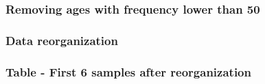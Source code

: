 \documentclass[
]{article}
\newenvironment{Shaded}{\begin{snugshade}}{\end{snugshade}}
\newcommand{\CommentTok}[1]{\textcolor[rgb]{0.56,0.35,0.01}{\textit{#1}}}
\newcommand{\DataTypeTok}[1]{\textcolor[rgb]{0.13,0.29,0.53}{#1}}
\newcommand{\DecValTok}[1]{\textcolor[rgb]{0.00,0.00,0.81}{#1}}
\newcommand{\KeywordTok}[1]{\textcolor[rgb]{0.13,0.29,0.53}{\textbf{#1}}}
\newcommand{\NormalTok}[1]{#1}
\newcommand{\OperatorTok}[1]{\textcolor[rgb]{0.81,0.36,0.00}{\textbf{#1}}}
\newcommand{\StringTok}[1]{\textcolor[rgb]{0.31,0.60,0.02}{#1}}
\begin{document}
\hypertarget{removing-ages-with-frequency-lower-than-50}{%
\subsubsection{Removing ages with frequency lower than
50}\label{removing-ages-with-frequency-lower-than-50}}

\label{show-remove-ages-lower-50}

\begin{Shaded}
\end{Shaded}

\hypertarget{data-reorganization-1}{%
\subsubsection{Data reorganization}\label{data-reorganization-1}}

\label{show-reorganizing-dat}

\begin{Shaded}
\end{Shaded}

\hypertarget{table---first-6-samples-after-reorganization}{%
\subsubsection{Table - First 6 samples after
reorganization}\label{table---first-6-samples-after-reorganization}}
\end{document}
